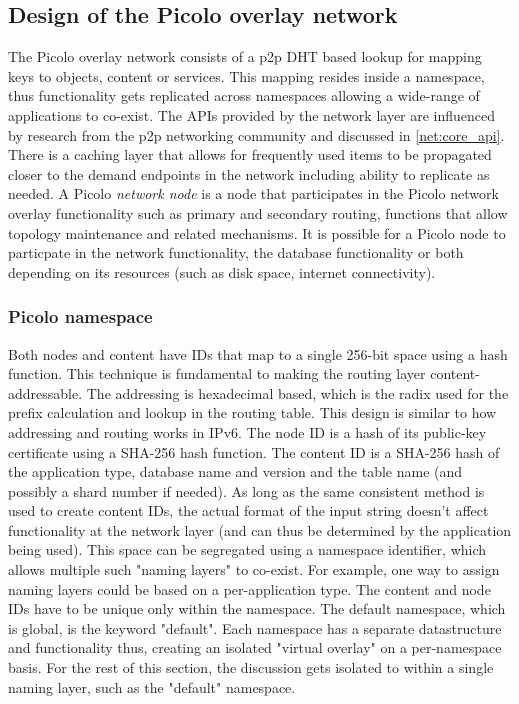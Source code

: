 \subsection{Design of the Picolo overlay network}
\label{net:design}

The \textsf{Picolo} overlay network consists of a p2p DHT based lookup for mapping keys to objects, content or services. This
mapping resides inside a namespace, thus functionality gets replicated across namespaces allowing a wide-range of
applications to co-exist. The APIs provided by the network layer are influenced by research from the p2p networking
community and discussed in \cref{net:core_api}.  There is a caching layer that allows for frequently used items to
be propagated closer to the demand endpoints in the network including ability to replicate as needed. A \textsf{Picolo} {\em network node} is a node that participates in the \textsf{Picolo} network overlay functionality such as primary and
secondary routing, functions that allow topology maintenance and related mechanisms. It is possible for a \textsf{Picolo} node to
particpate in the network functionality, the database functionality or both depending on its resources (such as disk
space, internet connectivity).

\subsubsection{Picolo namespace} 
\label{net:namespace}

Both nodes and content have IDs that map to a single 256-bit space using a hash function. This technique is fundamental
to making the routing layer content-addressable. The addressing is hexadecimal based, which is the radix used for the
prefix calculation and lookup in the routing table. This design is similar to how addressing and routing works in IPv6.
The node ID is a hash of its public-key certificate using a SHA-256 hash function. The content ID is a SHA-256 hash of
the application type, database name and version and the table name (and possibly a shard number if needed). As long as
the same consistent method is used to create content IDs, the actual format of the input string doesn't affect
functionality at the network layer (and can thus be determined by the application being used). 
\newline\newline
This space can be segregated using a namespace identifier, which allows multiple such "naming layers" to co-exist. For
example, one way to assign naming layers could be based on a per-application type. The content and node IDs have to be
unique only within the namespace. The default namespace, which is global, is the keyword "default". Each namespace has a separate datastructure and functionality thus, creating an isolated "virtual overlay" on a
per-namespace basis. For the rest of this section, the discussion gets isolated to within a single naming layer, such as
the "default" namespace.


